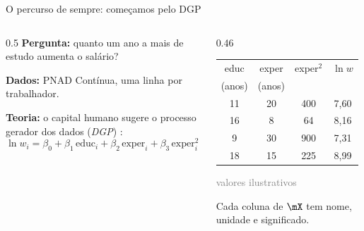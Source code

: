 \documentclass[aspectratio=169,11pt]{beamer}
\begin{document}
\begin{frame}{O percurso de sempre: começamos pelo DGP}
  \begin{columns}[T]
    \begin{column}{0.5\textwidth}
      \textbf{Pergunta:} quanto um ano a mais de estudo aumenta o salário?
      \medskip

      \textbf{Dados:} PNAD Contínua, uma linha por trabalhador.
      \medskip

      \textbf{Teoria:} o capital humano sugere o processo gerador dos dados
      (\emph{DGP}) \parencite{mincer1974}:
      \small
      \[ \ln w_i = \beta_0 + \beta_1\,\text{educ}_i + \beta_2\,\text{exper}_i
                   + \beta_3\,\text{exper}_i^2 + \varepsilon_i \]
    \end{column}
    \begin{column}{0.46\textwidth}
      \centering\small
      \begin{tabular}{@{}cccc@{}}
        \toprule
        educ & exper & exper$^2$ & $\ln w$ \\
        (anos) & (anos) & & \\
        \midrule
        11 & 20 &  400 & 7,60 \\
        16 &  8 &   64 & 8,16 \\
         9 & 30 &  900 & 7,31 \\
        18 & 15 &  225 & 8,99 \\
        \bottomrule
      \end{tabular}
      \par\smallskip
      {\footnotesize\textcolor{gray}{valores ilustrativos}}
      \medskip
      \begin{intuicao}
        \small Cada coluna de $\mX$ tem \alert{nome, unidade e significado}.
      \end{intuicao}
    \end{column}
  \end{columns}
\end{frame}
\end{document}
